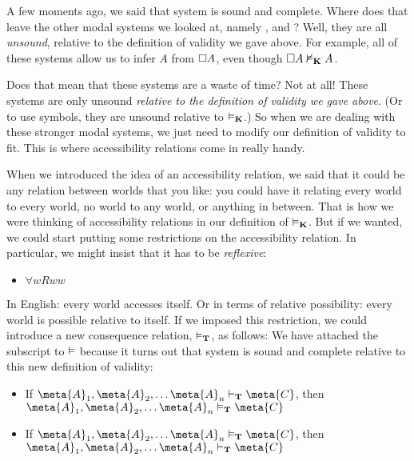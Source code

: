 A few moments ago, we said that system \mlK{} is sound and complete. Where does that leave the other modal systems we looked at, namely  \mlT, \mlSfour{} and \mlSfive? Well, they are all \emph{unsound}, relative to the definition of validity we gave above. For example, all of these systems allow us to infer $A$ from $\Box A$, even though $\Box A\nvDash_{\mathbf{K}} A$.

Does that mean that these systems are a waste of time? Not at all! These systems are only unsound \emph{relative to the definition of validity we gave above}. (Or to use symbols, they are unsound relative to $\vDash_{\mathbf{K}}$.) So when we are dealing with these stronger modal systems, we just need to modify our definition of validity to fit. This is where accessibility relations come in really handy.

When we introduced the idea of an accessibility relation, we said that it could be any relation between worlds that you like: you could have it relating every world to every world, no world to any world, or anything in between. That is how we were thinking of accessibility relations in our definition of $\vDash_{\mathbf{K}}$. But if we wanted, we could start putting some restrictions on the accessibility relation. In particular, we might insist that it has to be \emph{reflexive}:
\begin{itemize}
	\item $\forall wRww$
\end{itemize}
In English: every world accesses itself. Or in terms of relative possibility: every world is possible relative to itself. If we imposed this restriction, we could introduce a new consequence relation, $\vDash_{\mathbf{T}}$, as follows:
We have attached the \mlT{} subscript to $\vDash$ because it turns out that system \mlT{} is sound and complete relative to this new definition of validity:
\begin{itemize}
	\item If $\meta{A}_1,\meta{A}_2, \dots \meta{A}_n\proves_\mlT\meta{C}$, then $\meta{A}_1,\meta{A}_2, \dots \meta{A}_n\entails_\mlT\meta{C}$
	\item If $\meta{A}_1,\meta{A}_2, \dots \meta{A}_n\entails_\mlT\meta{C}$, then $\meta{A}_1,\meta{A}_2, \dots \meta{A}_n\proves_\mlT\meta{C}$
\end{itemize}
